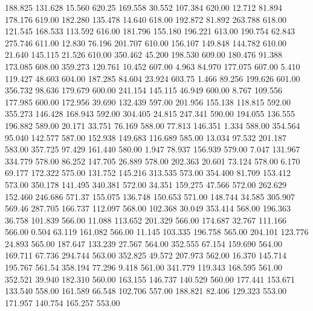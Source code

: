  188.825  131.628   15.560       620.25
 169.558   30.552  107.384       620.00
  12.712   81.894  178.176       619.00
 182.280  135.478   14.640       618.00
 192.872   81.892  263.788       618.00
 121.545  168.533  113.592       616.00
 181.796  155.180  196.221       613.00
 190.754   62.843  275.746       611.00
  12.830   76.196  201.707       610.00
 156.107  149.848  144.782       610.00
  21.640  145.115   21.526       610.00
 350.462   45.200  198.530       609.00
 180.476   91.388  173.085       608.00
 359.273  120.761   10.452       607.00
   4.963   84.970  177.075       607.00
   5.410  119.427   48.603       604.00
 187.285   84.604   23.924       603.75
   1.466   89.256  199.626       601.00
 356.732   98.636  179.679       600.00
 241.154  145.115   46.949       600.00
   8.767  109.556  177.985       600.00
 172.956   39.690  132.439       597.00
 201.956  155.138  118.815       592.00
 355.273  146.428  168.943       592.00
 304.405   24.815  247.341       590.00
 194.055  136.555  196.882       589.00
  20.171   33.751   76.169       588.00
  77.813  146.351    1.334       588.00
 354.564   95.040  142.577       587.00
 152.938  149.683  116.689       585.00
  13.034   97.532  201.187       583.00
 357.725   97.429  161.440       580.00
   1.947   78.937  156.939       579.00
   7.047  131.967  334.779       578.00
  86.252  147.705   26.889       578.00
 202.363   20.601   73.124       578.00
   6.170   69.177  172.322       575.00
 131.752  145.216  313.535       573.00
 354.400   81.709  153.412       573.00
 350.178  141.495  340.381       572.00
  34.351  159.275   47.566       572.00
 262.629  152.460  246.686       571.37
 155.075  136.748  150.653       571.00
 148.744   34.585  305.907       569.46
 287.705  166.737  112.097       568.00
 102.368   30.049  353.414       568.00
 196.363   36.758  101.839       566.00
  11.088  113.652  201.329       566.00
 174.687   32.767  111.166       566.00
   0.504   63.119  161.082       566.00
  11.145  103.335  196.758       565.00
 204.101  123.776   24.893       565.00
 187.647  133.239   27.567       564.00
 352.555   67.154  159.690       564.00
 169.711   67.736  294.744       563.00
 352.825   49.572  207.973       562.00
  16.370  145.714  195.767       561.54
 358.194   77.296    9.418       561.00
 341.779  119.343  168.595       561.00
 352.521   39.940  182.310       560.00
 163.155  146.737  140.529       560.00
 177.441  153.671  133.540       558.00
 161.589   66.548  102.706       557.00
 188.821   82.406  129.323       553.00
 171.957  140.754  165.257       553.00
